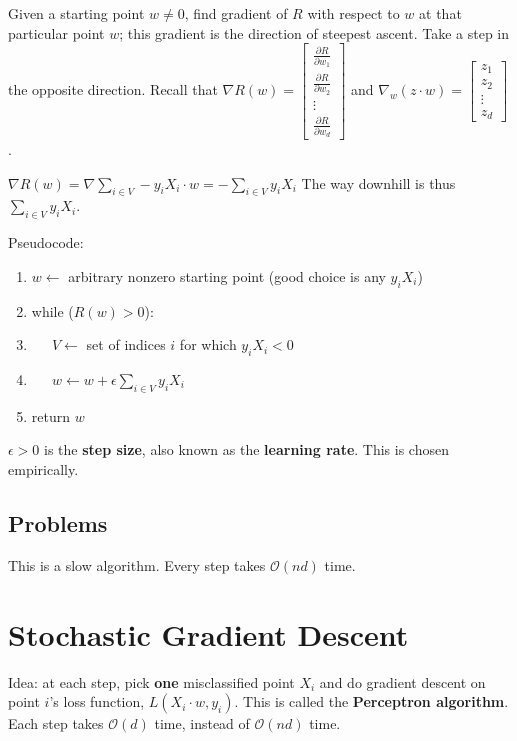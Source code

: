 Given a starting point $w \neq 0$, find gradient of $R$ with respect to $w$ at that particular point $w$;
this gradient is the direction of steepest ascent.
Take a step in the opposite direction.
Recall that $\nabla R(w) = \begin{bmatrix}
    \frac{\partial R}{\partial w_1} \\
    \frac{\partial R}{\partial w_2} \\
    \vdots \\
    \frac{\partial R}{\partial w_d}
\end{bmatrix}$ and $\nabla_w(z\cdot w) = \begin{bmatrix}
    z_1 \\
    z_2 \\
    \vdots \\
    z_d
\end{bmatrix}$.

$\nabla R(w) = \nabla \sum_{i\in V} -y_i  X_i \cdot w = - \sum_{i\in V}y_i X_i$
The way downhill is thus $\sum_{i\in V}y_i X_i$.

Pseudocode:
\begin{enumerate}
    \item $w \gets $ arbitrary nonzero starting point (good choice is any $y_iX_i$)
    \item while ($R(w) > 0$):
    \item $\;\;\;\;$ $V \gets$ set of indices $i$ for which $y_iX_i < 0$
    \item $\;\;\;\;$ $w \gets w + \epsilon \sum\limits_{i \in V} y_iX_i$
    \item return $w$
\end{enumerate}
$\epsilon > 0$ is the \textbf{step size}, also known as the \textbf{learning rate}.
This is chosen empirically.

\subsection{Problems}
This is a slow algorithm.
Every step takes $\mathcal O (nd)$ time.

\section{Stochastic Gradient Descent}
Idea: at each step, pick \textbf{one} misclassified point $X_i$ and do gradient descent on point $i$'s loss function, $L(X_i \cdot w, y_i)$.
This is called the \textbf{Perceptron algorithm}.
Each step takes $\mathcal O (d)$ time, instead of $\mathcal O(nd)$ time.

